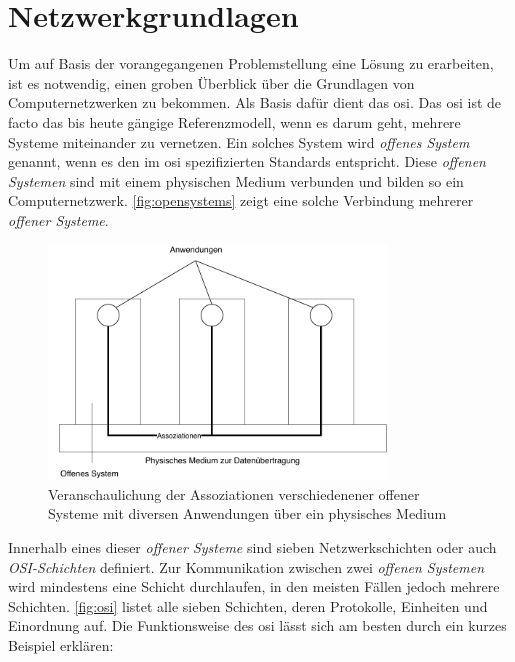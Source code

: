 \documentclass[titlepage]{report}
\begin{document}
\section*{Netzwerkgrundlagen}
Um auf Basis der vorangegangenen Problemstellung eine Lösung zu
erarbeiten, ist es notwendig, einen groben Überblick über die Grundlagen
von Computernetzwerken zu bekommen. Als Basis dafür dient das \gls{osi}. Das
\gls{osi} ist de facto das bis heute gängige Referenzmodell, wenn es
darum geht, mehrere Systeme miteinander zu vernetzen. Ein solches System
wird \emph{offenes System} genannt, wenn es den im \gls{osi}
spezifizierten Standards entspricht\cite[Siehe Abschnitt
4.1.2]{ITUOSI}. Diese \emph{offenen Systemen} sind mit einem physischen
Medium verbunden und bilden so ein Computernetzwerk. \autoref{fig:opensystems}
zeigt eine solche Verbindung mehrerer \emph{offener Systeme}.
\begin{figure}[H]
    \centering
    \includegraphics[width=0.8\textwidth]{figures/open_systems.pdf}
    \caption{Veranschaulichung der Assoziationen verschiedenener offener
    Systeme mit diversen Anwendungen über ein physisches Medium}\label{fig:opensystems}
\end{figure}
Innerhalb eines dieser \emph{offener Systeme} sind sieben
Netzwerkschichten oder auch \emph{OSI-Schichten} definiert\cite[Siehe
Abschnitt 6.1.2]{ITUOSI}. Zur
Kommunikation zwischen zwei \emph{offenen Systemen} wird mindestens eine
Schicht durchlaufen, in den meisten Fällen jedoch mehrere Schichten.
\autoref{fig:osi} listet alle sieben Schichten, deren Protokolle,
Einheiten und Einordnung auf. Die Funktionsweise des \gls{osi} lässt
sich am besten durch ein kurzes Beispiel erklären:
\end{document}
